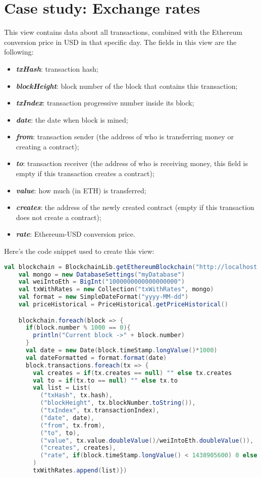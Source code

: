 \section{Case study: Exchange rates}
\label{exchangerates}
This view contains data about all transactions, combined with the Ethereum conversion price in USD in that specific day. 
The fields in this view are the following:
\begin{itemize}
    \item \textit{\textbf{txHash}}: transaction hash;
    \item \textit{\textbf{blockHeight}}: block number of the block that contains this transaction;
    \item \textit{\textbf{txIndex}}: transaction progressive number inside its block;
    \item \textit{\textbf{date}}: the date when block is mined;
    \item \textit{\textbf{from}}: transaction sender (the address of who is transferring money or creating a contract);
    \item \textit{\textbf{to}}: transaction receiver (the address of who is receiving money, this field is empty if this transaction creates a contract);
    \item \textit{\textbf{value}}: how much (in ETH) is transferred;
    \item \textit{\textbf{creates}}: the address of the newly created contract (empty if this transaction does not create a contract);
    \item \textit{\textbf{rate}}: Ethereum-USD conversion price.
\end{itemize}
Here's the code snippet used to create this view:
\begin{lstlisting}[language=Scala]
    val blockchain = BlockchainLib.getEthereumBlockchain("http://localhost:8545")
    val mongo = new DatabaseSettings("myDatabase")
    val weiIntoEth = BigInt("1000000000000000000")
    val txWithRates = new Collection("txWithRates", mongo)
    val format = new SimpleDateFormat("yyyy-MM-dd")
    val priceHistorical = PriceHistorical.getPriceHistorical()

    blockchain.foreach(block => {
      if(block.number % 1000 == 0){
        println("Current block ->" + block.number)
      }
      val date = new Date(block.timeStamp.longValue()*1000)
      val dateFormatted = format.format(date)
      block.transactions.foreach(tx => {
        val creates = if(tx.creates == null) "" else tx.creates
        val to = if(tx.to == null) "" else tx.to
        val list = List(
          ("txHash", tx.hash),
          ("blockHeight", tx.blockNumber.toString()),
          ("txIndex", tx.transactionIndex),
          ("date", date),
          ("from", tx.from),
          ("to", to),
          ("value", tx.value.doubleValue()/weiIntoEth.doubleValue()),
          ("creates", creates),
          ("rate", if(block.timeStamp.longValue() < 1438905600) 0 else priceHistorical.price_usd(dateFormatted))
        )
        txWithRates.append(list)})
\end{lstlisting}
